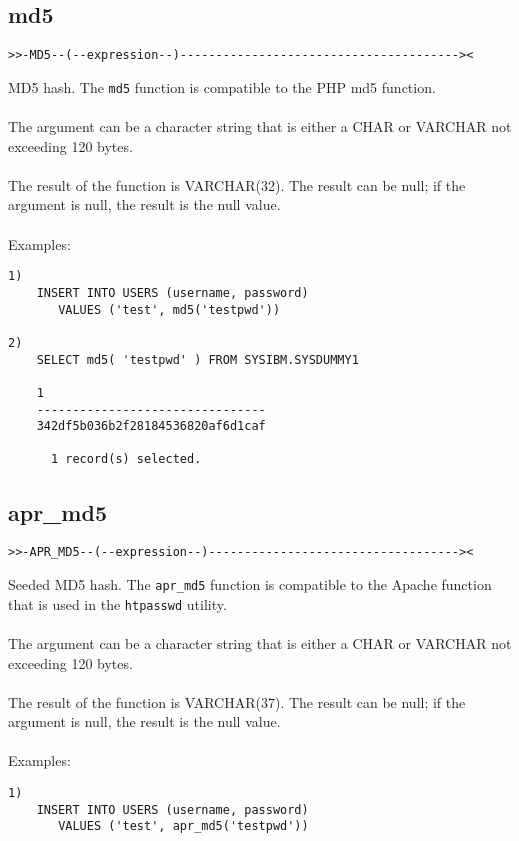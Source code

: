 \documentclass[11pt,a4paper]{article}
\begin{document}
\begin{appendix}
\subsection{md5} \label{md5}
\begin{verbatim}
>>-MD5--(--expression--)---------------------------------------><
\end{verbatim}
MD5 hash. The {\tt md5} function is compatible to the PHP md5 function.\\
\\
The argument can be a character string that is either a \mbox{CHAR} or \mbox{VARCHAR} not exceeding 120 bytes.\\
\\
The result of the function is VARCHAR(32). The result can be null; if the argument is null, the result is the null value.\\
\\
Examples:
\begin{verbatim}
1)
    INSERT INTO USERS (username, password)
       VALUES ('test', md5('testpwd'))

2)
    SELECT md5( 'testpwd' ) FROM SYSIBM.SYSDUMMY1

    1
    --------------------------------
    342df5b036b2f28184536820af6d1caf

      1 record(s) selected.
\end{verbatim}
\newpage
\subsection{apr\_md5} \label{aprmd5}
\begin{verbatim}
>>-APR_MD5--(--expression--)-----------------------------------><
\end{verbatim}
Seeded MD5 hash. The {\tt apr\_md5} function is compatible to the Apache function that is used in the {\tt htpasswd} utility.\\
\\
The argument can be a character string that is either a \mbox{CHAR} or \mbox{VARCHAR} not exceeding 120 bytes.\\
\\
The result of the function is VARCHAR(37). The result can be null; if the argument is null, the result is the null value.\\
\\
Examples:
\begin{verbatim}
1)
    INSERT INTO USERS (username, password)
       VALUES ('test', apr_md5('testpwd'))


\end{verbatim}
\end{appendix}
\end{document}
